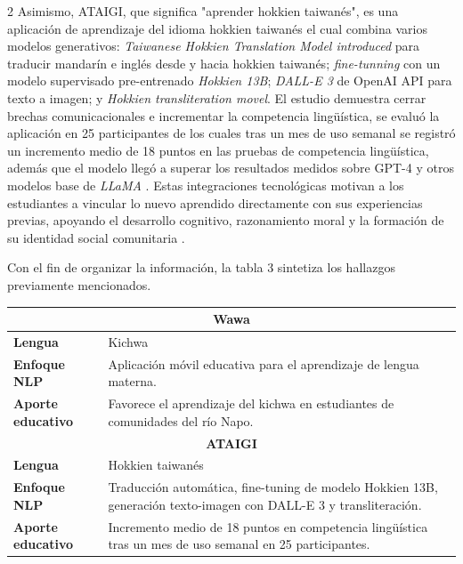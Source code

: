 \documentclass[12pt,twoside,titlepage]{ingenius}
\begin{document}
\begin{multicols}{2}
Asimismo, ATAIGI, que significa "aprender hokkien taiwanés", es una aplicación de aprendizaje del idioma hokkien taiwanés el cual combina varios modelos generativos: \textit{Taiwanese Hokkien Translation Model introduced} para traducir mandarín e inglés desde y hacia hokkien taiwanés; \textit{fine-tunning} con un modelo supervisado pre-entrenado \textit{Hokkien 13B}; \textit{DALL-E 3} de OpenAI API para texto a imagen; y \textit{Hokkien transliteration movel}. El estudio demuestra cerrar brechas comunicacionales e incrementar la competencia lingüística, se evaluó la aplicación en 25 participantes de los cuales tras un mes de uso semanal se registró un incremento medio de 18 puntos en las pruebas de competencia lingüística, además que el modelo llegó a superar los resultados medidos sobre GPT-4 y otros modelos base de \textit{LLaMA} \cite{Chu2025}. 
Estas integraciones tecnológicas motivan a los estudiantes a vincular lo nuevo aprendido directamente con sus experiencias previas, apoyando el desarrollo cognitivo, razonamiento moral y la formación de su identidad social comunitaria \cite{Wakhare2026}.

Con el fin de organizar la información, la tabla 3 sintetiza los hallazgos previamente mencionados.

\begin{table}[H]
\centering
{}
\small
    \begin{tabular}{p{2.2cm}p{4.8cm}}
    \toprule
    \multicolumn{2}{c}{\textbf{Wawa}} \\
    \midrule
    \textbf{Lengua} & Kichwa \\ \addlinespace
    \textbf{Enfoque NLP} & Aplicación móvil educativa para el aprendizaje de lengua materna. \\ \addlinespace
    \textbf{Aporte educativo} & Favorece el aprendizaje del kichwa en estudiantes de comunidades del río Napo. \\
    \midrule
    \multicolumn{2}{c}{\textbf{ATAIGI}} \\
    \midrule
    \textbf{Lengua} & Hokkien taiwanés \\ \addlinespace
    \textbf{Enfoque NLP} & Traducción automática, fine-tuning de modelo Hokkien 13B, generación texto-imagen con DALL-E 3 y transliteración. \\ \addlinespace
    \textbf{Aporte educativo} & Incremento medio de 18 puntos en competencia lingüística tras un mes de uso semanal en 25 participantes. \\
    \bottomrule
    \end{tabular}
\label{tab:nlp_lengua_materna_educacion}
\end{table}



\end{multicols}
\end{document}
